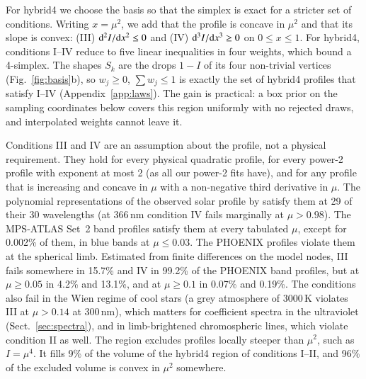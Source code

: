 \documentclass{aa}
\begin{document}
For hybrid4 we choose the basis so that the simplex is exact for a stricter
set of conditions. Writing $x=\mu^2$, we add that the profile is concave in
$\mu^2$ and that its slope is convex: (III) ${\rm d}^2I/{\rm d}x^2\le0$ and
(IV) ${\rm d}^3I/{\rm d}x^3\ge0$ on $0\le x\le1$. For hybrid4, conditions
I--IV reduce to five linear inequalities in four weights, which bound a
4-simplex. The shapes $S_k$ are the drops $1-I$ of its four non-trivial
vertices (Fig.~\ref{fig:basis}b), so $w_j\ge0$, $\sum w_j\le1$ is exactly the
set of hybrid4 profiles that satisfy I--IV (Appendix~\ref{app:laws}). The gain
is practical: a box prior on the sampling coordinates below covers this
region uniformly with no rejected draws, and interpolated weights cannot leave
it.

Conditions III and IV are an assumption about the profile, not a physical
requirement. They hold for every physical quadratic profile, for every power-2
profile with exponent at most 2 (as all our power-2 fits have), and for
any profile that is increasing and concave in $\mu$ with a non-negative third
derivative in $\mu$. The polynomial representations of the observed solar
profile by \citet{neckel1994} satisfy them at 29 of their 30
wavelengths (at 366\,nm condition IV fails marginally at $\mu>0.98$). The MPS-ATLAS Set~2 band profiles satisfy them at every
tabulated $\mu$, except for 0.002\% of them, in blue bands at $\mu\le0.03$.
The PHOENIX profiles violate them at the spherical limb. Estimated from finite
differences on the model nodes, III fails somewhere in 15.7\% and IV in
99.2\% of the PHOENIX band profiles, but at $\mu\ge0.05$ in 4.2\% and
13.1\%, and at $\mu\ge0.1$ in 0.07\% and 0.19\%. The conditions also fail
in the Wien regime of cool stars (a grey atmosphere of 3000\,K violates
III at $\mu>0.14$ at 300\,nm), which matters for coefficient spectra in the
ultraviolet (Sect.~\ref{sec:spectra}), and in limb-brightened
chromospheric lines, which violate condition II as well. The region excludes
profiles locally steeper than $\mu^2$, such as $I=\mu^4$. It fills 9\% of the
volume of the hybrid4 region of conditions I--II, and 96\% of the excluded
volume is convex in $\mu^2$ somewhere.
\end{document}
